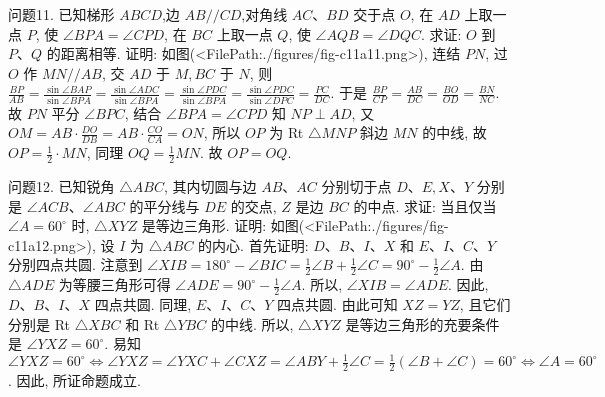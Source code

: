 问题11. 已知梯形 $A B C D$,边 $A B / / C D$,对角线 $A C 、 B D$ 交于点 $O$, 在 $A D$ 上取一点 $P$, 使 $\angle B P A=\angle C P D$, 在 $B C$ 上取一点 $Q$, 使 $\angle A Q B=\angle D Q C$. 求证: $O$ 到 $P 、 Q$ 的距离相等.
证明: 如图(<FilePath:./figures/fig-c11a11.png>), 连结 $P N$, 过 $O$ 作 $M N / / A B$, 交 $A D$ 于 $M, B C$ 于 $N$, 则 $\frac{B P}{A B}=\frac{\sin \angle B A P}{\sin \angle B P A}=\frac{\sin \angle A D C}{\sin \angle B P A}= \frac{\sin \angle P D C}{\sin \angle B P A}=\frac{\sin \angle P D C}{\sin \angle D P C}=\frac{P C}{D C}$.
于是 $\frac{B P}{C P}=\frac{A B}{D C}=\frac{B O}{O D}=\frac{B N}{N C}$. 故 $P N$ 平分 $\angle B P C$, 结合 $\angle B P A=\angle C P D$ 知 $N P \perp A D$, 又 $O M=A B \cdot \frac{D O}{D B}=A B \cdot \frac{C O}{C A}=O N$, 所以 $O P$ 为 Rt $\triangle M N P$ 斜边 $M N$ 的中线, 故 $O P=\frac{1}{2} \cdot M N$, 同理 $O Q=\frac{1}{2} M N$. 故 $O P=O Q$.



问题12. 已知锐角 $\triangle A B C$, 其内切圆与边 $A B 、 A C$ 分别切于点 $D 、 E, X 、 Y$ 分别是 $\angle A C B 、 \angle A B C$ 的平分线与 $D E$ 的交点, $Z$ 是边 $B C$ 的中点.
求证: 当且仅当 $\angle A=60^{\circ}$ 时, $\triangle X Y Z$ 是等边三角形.
证明: 如图(<FilePath:./figures/fig-c11a12.png>), 设 $I$ 为 $\triangle A B C$ 的内心.
首先证明: $D 、 B 、 I 、 X$ 和 $E 、 I 、 C 、 Y$ 分别四点共圆.
注意到 $\angle X I B=180^{\circ}-\angle B I C=\frac{1}{2} \angle B+\frac{1}{2} \angle C=90^{\circ}- \frac{1}{2} \angle A$. 由 $\triangle A D E$ 为等腰三角形可得 $\angle A D E=90^{\circ}- \frac{1}{2} \angle A$. 所以, $\angle X I B=\angle A D E$. 因此, $D 、 B 、 I 、 X$ 四点共圆.
同理, $E 、 I 、 C 、 Y$ 四点共圆.
由此可知 $X Z=Y Z$, 且它们分别是 Rt $\triangle X B C$ 和 Rt $\triangle Y B C$ 的中线.
所以, $\triangle X Y Z$ 是等边三角形的充要条件是 $\angle Y X Z=60^{\circ}$. 易知 $\angle Y X Z=60^{\circ} \Leftrightarrow \angle Y X Z=\angle Y X C+\angle C X Z= \angle A B Y+\frac{1}{2} \angle C=\frac{1}{2}(\angle B+\angle C)=60^{\circ} \Leftrightarrow \angle A=60^{\circ}$. 因此, 所证命题成立.



